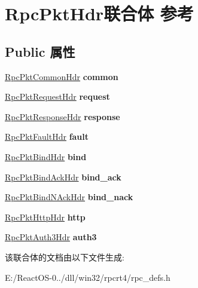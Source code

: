 \hypertarget{union_rpc_pkt_hdr}{}\section{Rpc\+Pkt\+Hdr联合体 参考}
\label{union_rpc_pkt_hdr}
\subsection*{Public 属性}
\begin{DoxyCompactItemize}
\item 
\mbox{\label{union_rpc_pkt_hdr_a7ae28d515accbd1d68a062608e6ed426}} 
\hyperlink{struct_rpc_pkt_common_hdr}{Rpc\+Pkt\+Common\+Hdr} {\bfseries common}
\item 
\mbox{\label{union_rpc_pkt_hdr_ae0e624b31c6412d9d2c242734d1c1db8}} 
\hyperlink{struct_rpc_pkt_request_hdr}{Rpc\+Pkt\+Request\+Hdr} {\bfseries request}
\item 
\mbox{\label{union_rpc_pkt_hdr_a83b7356e8c1e5635cb9c19635fd56d6e}} 
\hyperlink{struct_rpc_pkt_response_hdr}{Rpc\+Pkt\+Response\+Hdr} {\bfseries response}
\item 
\mbox{\label{union_rpc_pkt_hdr_a187906d0a248967b1df5c49d20b62738}} 
\hyperlink{struct_rpc_pkt_fault_hdr}{Rpc\+Pkt\+Fault\+Hdr} {\bfseries fault}
\item 
\mbox{\label{union_rpc_pkt_hdr_ae0c7f53902804c28a7caf1e8e773a996}} 
\hyperlink{struct_rpc_pkt_bind_hdr}{Rpc\+Pkt\+Bind\+Hdr} {\bfseries bind}
\item 
\mbox{\label{union_rpc_pkt_hdr_a9a2c179cc58f0ae6d407eaa5ec9e0ea7}} 
\hyperlink{struct_rpc_pkt_bind_ack_hdr}{Rpc\+Pkt\+Bind\+Ack\+Hdr} {\bfseries bind\+\_\+ack}
\item 
\mbox{\label{union_rpc_pkt_hdr_a9b427d7cab56a9788e2336d4f0b47029}} 
\hyperlink{struct_rpc_pkt_bind_n_ack_hdr}{Rpc\+Pkt\+Bind\+N\+Ack\+Hdr} {\bfseries bind\+\_\+nack}
\item 
\mbox{\label{union_rpc_pkt_hdr_a526e9b75d04e29697ab6ee5dbf123534}} 
\hyperlink{struct_rpc_pkt_http_hdr}{Rpc\+Pkt\+Http\+Hdr} {\bfseries http}
\item 
\mbox{\label{union_rpc_pkt_hdr_abc06700ee9ee9b94a62b8a72528b7f31}} 
\hyperlink{struct_rpc_pkt_auth3_hdr}{Rpc\+Pkt\+Auth3\+Hdr} {\bfseries auth3}
\end{DoxyCompactItemize}


该联合体的文档由以下文件生成\+:\begin{DoxyCompactItemize}
\item 
E\+:/\+React\+O\+S-\/0../dll/win32/rpcrt4/rpc\+\_\+defs.\+h\end{DoxyCompactItemize}
